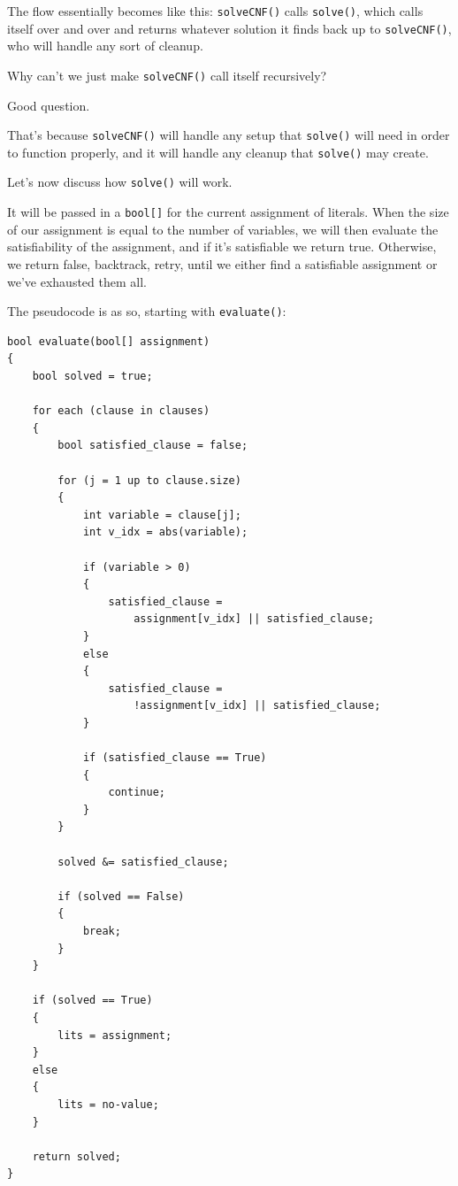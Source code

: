 The flow essentially becomes like this: \texttt{solveCNF()} calls
\texttt{solve()}, which calls itself over and over and returns whatever solution
it finds back up to \texttt{solveCNF()}, who will handle any sort of cleanup.

Why can't we just make \texttt{solveCNF()} call itself recursively?

Good question.

That's because \texttt{solveCNF()} will handle any setup that
\texttt{solve()} will need in order to function properly, and it will handle any
cleanup that \texttt{solve()} may create.

Let's now discuss how \texttt{solve()} will work.

It will be passed in a \texttt{bool[]} for the current assignment of literals.
When the size of our assignment is equal to the number of variables, we will
then evaluate the satisfiability of the assignment, and if it's satisfiable we
return true. Otherwise, we return false, backtrack, retry, until we either find a
satisfiable assignment or we've exhausted them all.

The pseudocode is as so, starting with \texttt{evaluate()}:

\begin{lstlisting}
bool evaluate(bool[] assignment)
{
    bool solved = true;

    for each (clause in clauses)
    {
        bool satisfied_clause = false;

        for (j = 1 up to clause.size)
        {
            int variable = clause[j];
            int v_idx = abs(variable);

            if (variable > 0)
            {
                satisfied_clause =
                    assignment[v_idx] || satisfied_clause;
            }
            else
            {
                satisfied_clause =
                    !assignment[v_idx] || satisfied_clause;
            }

            if (satisfied_clause == True)
            {
                continue;
            }
        }

        solved &= satisfied_clause;

        if (solved == False)
        {
            break;
        }
    }

    if (solved == True)
    {
        lits = assignment;
    }
    else
    {
        lits = no-value;
    }

    return solved;
}
\end{lstlisting}

